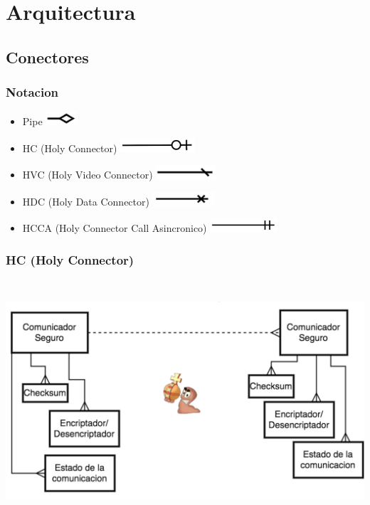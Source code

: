 
\section{Arquitectura}
\subsection{Conectores}
\subsubsection{Notacion}

\begin{itemize}
\item Pipe \includegraphics[height=0.5cm]{diagramas/NPIPE} 
\item HC (Holy Connector) \includegraphics[height=0.5cm]{diagramas/NHC} 
\item HVC (Holy Video Connector) \includegraphics[height=0.5cm]{diagramas/NHVC} 
\item HDC (Holy Data Connector) \includegraphics[height=0.5cm]{diagramas/NHDC} 
\item HCCA (Holy Connector Call Asincronico) \includegraphics[height=0.5cm]{diagramas/NHCCA} 

\end{itemize}

\subsubsection{HC (Holy Connector)}

\includegraphics[height=9cm]{diagramas/HC} 

